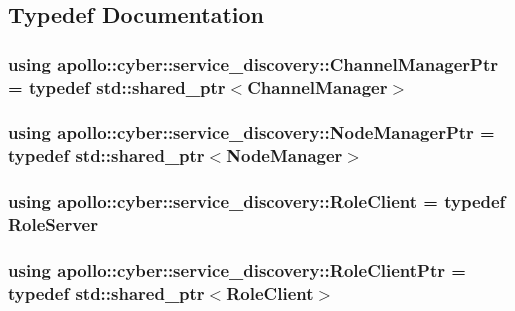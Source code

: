 \subsection{Typedef Documentation}
\hypertarget{namespaceapollo_1_1cyber_1_1service__discovery_a12c2dfc39551ef96e3110dae235ab609}{
\subsubsection[{Channel\-Manager\-Ptr}]{\setlength{\rightskip}{0pt plus 5cm}using {\bf apollo\-::cyber\-::service\-\_\-discovery\-::\-Channel\-Manager\-Ptr} = typedef std\-::shared\-\_\-ptr$<${\bf Channel\-Manager}$>$}}\label{namespaceapollo_1_1cyber_1_1service__discovery_a12c2dfc39551ef96e3110dae235ab609}
\hypertarget{namespaceapollo_1_1cyber_1_1service__discovery_a1e5adf7bd56b68299dae8d202f20bc81}{
\subsubsection[{Node\-Manager\-Ptr}]{\setlength{\rightskip}{0pt plus 5cm}using {\bf apollo\-::cyber\-::service\-\_\-discovery\-::\-Node\-Manager\-Ptr} = typedef std\-::shared\-\_\-ptr$<${\bf Node\-Manager}$>$}}\label{namespaceapollo_1_1cyber_1_1service__discovery_a1e5adf7bd56b68299dae8d202f20bc81}
\hypertarget{namespaceapollo_1_1cyber_1_1service__discovery_a2578fbdec532dea479a355ace565a5af}{
\subsubsection[{Role\-Client}]{\setlength{\rightskip}{0pt plus 5cm}using {\bf apollo\-::cyber\-::service\-\_\-discovery\-::\-Role\-Client} = typedef {\bf Role\-Server}}}\label{namespaceapollo_1_1cyber_1_1service__discovery_a2578fbdec532dea479a355ace565a5af}
\hypertarget{namespaceapollo_1_1cyber_1_1service__discovery_a9321a2a191c847f9b5e7704201a18ca2}{
\subsubsection[{Role\-Client\-Ptr}]{\setlength{\rightskip}{0pt plus 5cm}using {\bf apollo\-::cyber\-::service\-\_\-discovery\-::\-Role\-Client\-Ptr} = typedef std\-::shared\-\_\-ptr$<${\bf Role\-Client}$>$}}\label{namespaceapollo_1_1cyber_1_1service__discovery_a9321a2a191c847f9b5e7704201a18ca2}
